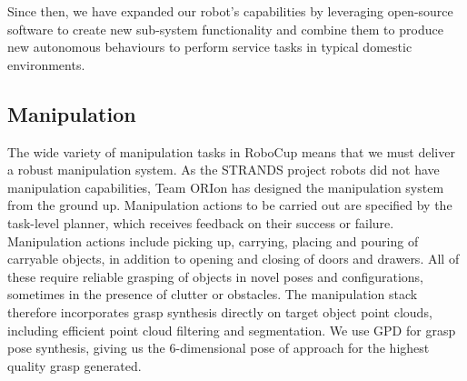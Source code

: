 \documentclass[runningheads,a4paper]{llncs}
\newcommand{\teamori}{Team ORIon}
\begin{document}


Since then, we have expanded our robot's capabilities by leveraging open-source software to create new sub-system functionality and combine them to produce new autonomous behaviours to perform service tasks in typical domestic environments.

\subsection{Manipulation}

The wide variety of manipulation tasks in RoboCup means that we must deliver a robust manipulation system.
%
As the STRANDS project robots did not have manipulation capabilities, \teamori{} has designed the manipulation system from the ground up.
%
Manipulation actions to be carried out are specified by the task-level planner, which receives feedback on their success or failure.
%
Manipulation actions include picking up, carrying, placing and pouring of carryable objects, in addition to opening and closing of doors and drawers.
%
All of these require reliable grasping of objects in novel poses and configurations, sometimes in the presence of clutter or obstacles.
%
The manipulation stack therefore incorporates grasp synthesis directly on target object point clouds, including efficient point cloud filtering and segmentation.
%
We use GPD \cite{GPD1,GPD2} for grasp pose synthesis, giving us the 6-dimensional pose of approach for the highest quality grasp generated.
\end{document}
